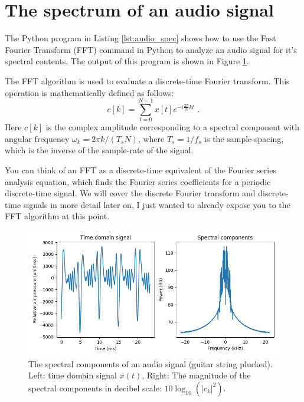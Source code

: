 \section{The spectrum of an audio signal}

The Python program in Listing \ref{lst:audio_spec} shows how to use the Fast Fourier Transform (FFT) command in Python to analyze an audio signal for it's spectral contents. The output of this program is shown in Figure \ref{fig:audio_spec}.

The FFT algorithm is used to evaluate a discrete-time Fourier transform. This operation is mathematically defined as follows:
\begin{equation}
c[k] = \sum_{t=0}^{N-1} x[t] e^{-i\frac{2\pi}{N}kt} \,\,.
\end{equation}
Here $c[k]$ is the complex amplitude corresponding to a spectral component with angular frequency $\omega_k = 2\pi k/(T_s N)$, where $T_s=1/f_s$ is the sample-spacing, which is the inverse of the sample-rate of the signal.

You can think of an FFT as a discrete-time equivalent of the Fourier series analysis equation, which finds the Fourier series coefficients for a periodic discrete-time signal. We will cover the discrete Fourier transform and discrete-time signals in more detail later on, I just wanted to already expose you to the FFT algorithm at this point.



\begin{figure}
\begin{center}
\includegraphics[width=\textwidth]{code/013_audio_spec/audio_spec.png}
\end{center}
\caption{The spectral components of an audio signal (guitar string plucked). Left: time domain signal $x(t)$, Right: The magnitude of the spectral components in decibel scale: $10\log_{10}(|c_k|^2)$.}
\label{fig:audio_spec}
\end{figure}
